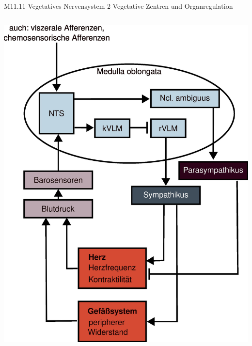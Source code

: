 \documentclass{beamer}
\begin{document}
\begin{frame}{M11.11 Vegetatives Nervensystem 2 Vegetative Zentren und Organregulation}
\begin{columns}[c]
\begin{column}{4cm}
        \begin{center}
        \includegraphics[width=\textwidth]{blutdruck.jpg}
    \end{center}

\end{column}


\end{columns}


\end{frame}
\end{document}
